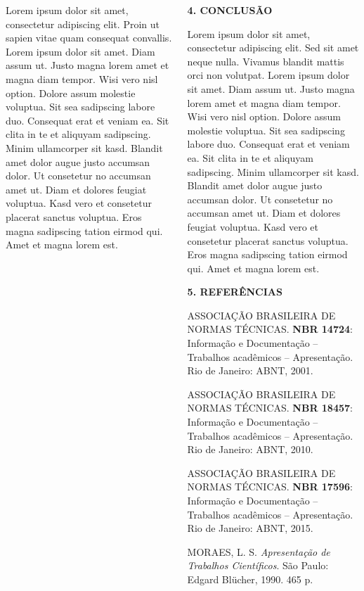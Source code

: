 \documentclass[final]{beamer}
\begin{document}
\begin{frame}[t]
\begin{columns}[t,totalwidth=0.6\paperwidth]
\begin{column}{0.45\paperwidth}
    \vspace{1em}
    \justifying
    Lorem ipsum dolor sit amet, consectetur adipiscing elit. Proin ut
    sapien vitae quam consequat convallis.
  Lorem ipsum dolor sit amet. Diam assum ut. Justo magna lorem amet et magna diam tempor. Wisi vero nisl option. Dolore assum molestie voluptua. Sit sea sadipscing labore duo. Consequat erat et veniam ea. Sit clita in te et aliquyam sadipscing. Minim ullamcorper sit kasd. Blandit amet dolor augue justo accumsan dolor. Ut consetetur no accumsan amet ut. Diam et dolores feugiat voluptua. Kasd vero et consetetur placerat sanctus voluptua. Eros magna sadipscing tation eirmod qui. Amet et magna lorem est.\\

    

  \end{column}
  \hspace{0.02\paperwidth} 

  \begin{column}{0.45\textwidth}
 
    {\large\bfseries 4. CONCLUSÃO}\par
    \justifying
     \vspace{1.3cm}
    Lorem ipsum dolor sit amet, consectetur adipiscing elit. Sed sit amet
    neque nulla. Vivamus blandit mattis orci non volutpat. Lorem ipsum dolor sit amet. Diam assum ut. Justo magna lorem amet et magna diam tempor. Wisi vero nisl option. Dolore assum molestie voluptua. Sit sea sadipscing labore duo. Consequat erat et veniam ea. Sit clita in te et aliquyam sadipscing. Minim ullamcorper sit kasd. Blandit amet dolor augue justo accumsan dolor. Ut consetetur no accumsan amet ut. Diam et dolores feugiat voluptua. Kasd vero et consetetur placerat sanctus voluptua. Eros magna sadipscing tation eirmod qui. Amet et magna lorem est.

    \vspace{1.3cm}
    {\large\bfseries 5. REFERÊNCIAS}\par

     \vspace{1.3cm}

    
    ASSOCIAÇÃO BRASILEIRA DE NORMAS TÉCNICAS. \textbf{NBR 14724}:
    Informação e Documentação – Trabalhos acadêmicos – Apresentação.
    Rio de Janeiro: ABNT, 2001.\par\medskip
    ASSOCIAÇÃO BRASILEIRA DE NORMAS TÉCNICAS. \textbf{NBR 18457}:
    Informação e Documentação – Trabalhos acadêmicos – Apresentação.
    Rio de Janeiro: ABNT, 2010.\par\medskip
    ASSOCIAÇÃO BRASILEIRA DE NORMAS TÉCNICAS. \textbf{NBR 17596}:
    Informação e Documentação – Trabalhos acadêmicos – Apresentação.
    Rio de Janeiro: ABNT, 2015.\par\medskip
    MORAES, L. S. \textit{Apresentação de Trabalhos Científicos}.
    São Paulo: Edgard Blücher, 1990. 465 p.
    \normalsize
  \end{column}
\end{columns}

\end{frame}
\end{document}
